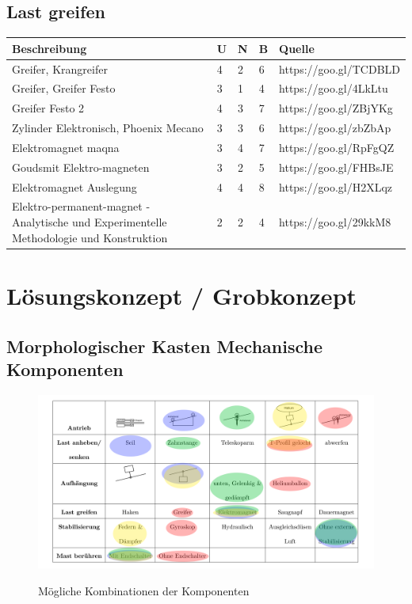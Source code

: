 \documentclass[a4paper]{report}
\begin{document}
\section{Last greifen}
\begin{tabular}{|p{}|p{}|p{}|p{}|p{}|}
	\hline
	\textbf{Beschreibung} & \textbf{U} & \textbf{N} & \textbf{B} & \textbf{Quelle} \\
	\hline
	Greifer, Krangreifer &4 &2 &6 & https://goo.gl/TCDBLD \\
	\hline
	Greifer, Greifer Festo &3 &1 &4 & https://goo.gl/4LkLtu\\
	\hline
	Greifer Festo 2 &4 &3 &7 & https://goo.gl/ZBjYKg\\
	\hline
	Zylinder Elektronisch, Phoenix Mecano &3 &3 &6 & https://goo.gl/zbZbAp\\
	\hline
	Elektromagnet maqna &3 &4 &7 & https://goo.gl/RpFgQZ\\
	\hline
	Goudsmit Elektro-magneten &3 &2 &5 & https://goo.gl/FHBsJE\\
	\hline
	Elektromagnet Auslegung &4 &4 &8 & https://goo.gl/H2XLqz\\
	\hline
	Elektro-permanent-magnet - Analytische und Experimentelle Methodologie und Konstruktion &2 &2 &4 & https://goo.gl/29kkM8\\
  \hline
\end{tabular}

\chapter{Lösungskonzept / Grobkonzept}
\section{Morphologischer Kasten Mechanische Komponenten}
\begin{figure}[h!]
	\includegraphics[keepaspectratio,width=\textwidth]{MorphKasten}
	\label{fig:Morphkasten}
	\caption{Mögliche Kombinationen der Komponenten}
\end{figure}
\clearpage
\end{document}

